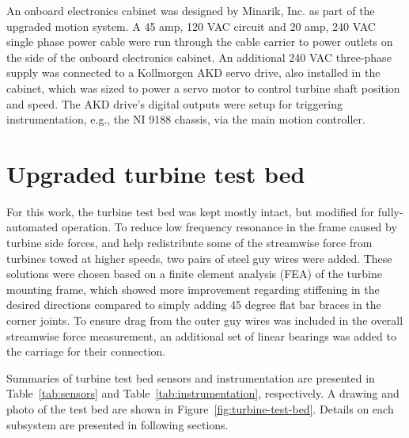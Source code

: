 An onboard electronics cabinet was designed by Minarik, Inc. as part of the
upgraded motion system. A 45 amp, 120 VAC circuit and 20 amp, 240 VAC single
phase power cable were run through the cable carrier to power outlets on the
side of the onboard electronics cabinet. An additional 240 VAC three-phase
supply was connected to a Kollmorgen AKD servo drive, also installed in the
cabinet, which was sized to power a servo motor to control turbine shaft
position and speed. The AKD drive's digital outputs were setup for triggering
instrumentation, e.g., the NI 9188 chassis, via the main motion controller.


\section{Upgraded turbine test bed}

For this work, the turbine test bed was kept mostly intact, but modified for
fully-automated operation. To reduce low frequency resonance in the frame caused
by turbine side forces, and help redistribute some of the streamwise force from
turbines towed at higher speeds, two pairs of steel guy wires were added. These
solutions were chosen based on a finite element analysis (FEA) of the turbine
mounting frame, which showed more improvement regarding stiffening in the
desired directions compared to simply adding 45 degree flat bar braces in the
corner joints. To ensure drag from the outer guy wires was included in the
overall streamwise force measurement, an additional set of linear bearings was
added to the carriage for their connection.

Summaries of turbine test bed sensors and instrumentation are presented in
Table~\ref{tab:sensors} and Table~\ref{tab:instrumentation}, respectively. A
drawing and photo of the test bed are shown in
Figure~\ref{fig:turbine-test-bed}. Details on each subsystem are presented in
following sections.

